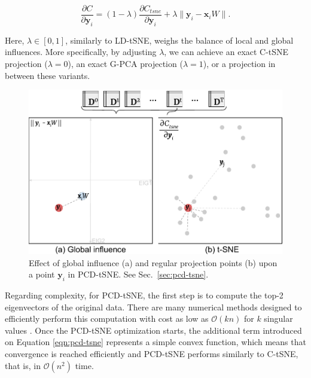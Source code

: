 \begin{equation}
\label{eqn:pcd-tsne}
\frac{\partial C}{\partial \mathbf{y}_{i}} = (1-\lambda) \frac{\partial C_{tsne}}{\partial \mathbf{y}_{i}} + \lambda \|\mathbf{y}_i - \mathbf{x}_i W \|.
\end{equation}

%
Here, $\lambda \in [0,1]$, similarly to LD-tSNE, weighs the balance of local and global influences. More specifically, by adjusting $\lambda$, we can achieve an exact C-tSNE projection ($\lambda=0$), an exact G-PCA projection ($\lambda=1$), or a projection in between these variants.


\begin{figure}[h]\centering
  \includegraphics[width=\linewidth]{figures/projection-algorithm/pcdtsne.pdf}
  \caption{Effect of global influence (a) and regular projection points (b) upon a point $\mathbf{y}_i$ in PCD-tSNE. See Sec.~\ref{sec:pcd-tsne}.}
  \label{fig:pcdtsne}
\end{figure}

Regarding complexity, for PCD-tSNE, the first step is to compute the top-2 eigenvectors of the original data. There are many numerical methods designed to efficiently perform this computation  with cost as low as $\mathcal{O}(kn)$ for $k$ singular values \citep{svd-complexity,cline2006computatio}.
Once the PCD-tSNE optimization starts, the additional term introduced on Equation \ref{eqn:pcd-tsne} represents a simple convex function, which means that convergence is reached efficiently and PCD-tSNE performs similarly to C-tSNE, that is, in $\mathcal{O}(n^2)$ time.


